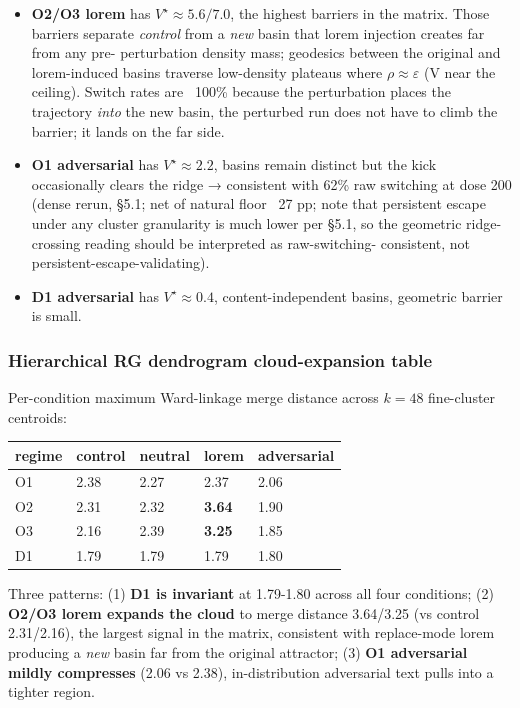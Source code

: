 \documentclass{article}
\theoremstyle{plain}
\theoremstyle{definition}
\begin{document}
\begin{itemize}
  \item \textbf{O2/O3 lorem} has $V^\star \approx 5.6 / 7.0$, the highest
  barriers in the matrix. Those barriers separate \textit{control} from a
  \textit{new} basin that lorem injection creates far from any pre-
  perturbation density mass; geodesics between the original and
  lorem-induced basins traverse low-density plateaus where
  $\rho \approx \varepsilon$ (V near the ceiling). Switch rates are
  ~100\% because the perturbation places the trajectory \textit{into} the
  new basin, the perturbed run does not have to climb the barrier;
  it lands on the far side.
  \item \textbf{O1 adversarial} has $V^\star \approx 2.2$, basins remain
  distinct but the kick occasionally clears the ridge → consistent
  with 62\% raw switching at dose 200 (dense rerun, §5.1; net of
  natural floor ~27 pp; note that persistent escape under any
  cluster granularity is much lower per §5.1, so the geometric
  ridge-crossing reading should be interpreted as raw-switching-
  consistent, not persistent-escape-validating).
  \item \textbf{D1 adversarial} has $V^\star \approx 0.4$, content-independent
  basins, geometric barrier is small.
\end{itemize}

\subsubsection*{Hierarchical RG dendrogram cloud-expansion table}

Per-condition maximum Ward-linkage merge distance across $k=48$
fine-cluster centroids:

\begin{table}[h!]
\centering
\small
\begin{tabularx}{\textwidth}{lYYYY}
\toprule
regime & control & neutral & lorem & adversarial \\
\midrule
O1 & 2.38 & 2.27 & 2.37 & 2.06 \\
O2 & 2.31 & 2.32 & \textbf{3.64} & 1.90 \\
O3 & 2.16 & 2.39 & \textbf{3.25} & 1.85 \\
D1 & 1.79 & 1.79 & 1.79 & 1.80 \\
\bottomrule
\end{tabularx}
\end{table}

Three patterns: (1) \textbf{D1 is invariant} at 1.79-1.80 across all
four conditions; (2) \textbf{O2/O3 lorem expands the cloud} to merge
distance 3.64/3.25 (vs control 2.31/2.16), the largest signal in
the matrix, consistent with replace-mode lorem producing a \textit{new}
basin far from the original attractor; (3) \textbf{O1 adversarial mildly
compresses} (2.06 vs 2.38), in-distribution adversarial text
pulls into a tighter region.
\end{document}
